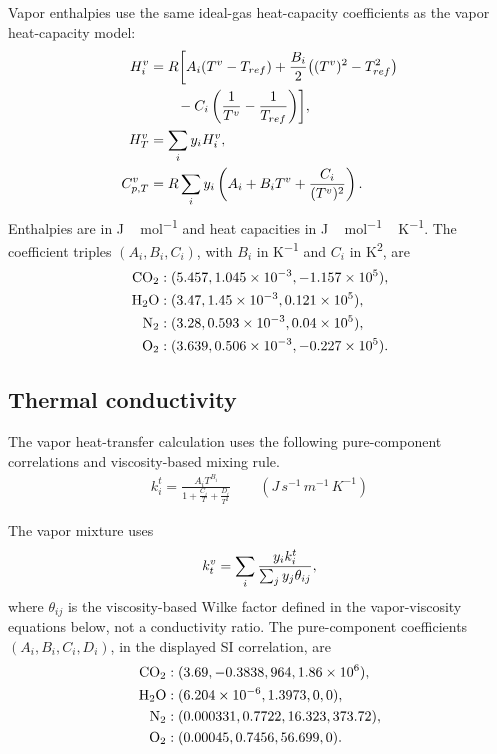Vapor enthalpies use the same ideal-gas heat-capacity coefficients as the vapor heat-capacity model:
\begin{align}
H_i^v &= R\biggl[A_i(T^v-T_{ref})+\frac{B_i}{2}\bigl((T^v)^2-T_{ref}^2\bigr)\notag\\
&\qquad-C_i\left(\frac{1}{T^v}-\frac{1}{T_{ref}}\right)\biggr],\\
H_T^v&=\sum_i y_iH_i^v,\\
C_{p,T}^v&=R\sum_i y_i\left(A_i+B_iT^v+\frac{C_i}{(T^v)^2}\right).
\end{align}
Enthalpies are in \unit{J\,mol^{-1}} and heat capacities in \unit{J\,mol^{-1}\,K^{-1}}.
The coefficient triples \((A_i,B_i,C_i)\), with \(B_i\) in \unit{K^{-1}} and \(C_i\) in \unit{K^2}, are
\begin{align*}
\COtwo &: (5.457,1.045\times10^{-3},-1.157\times10^5),\\
\HtwoO &: (3.47,1.45\times10^{-3},0.121\times10^5),\\
\Ntwo &: (3.28,0.593\times10^{-3},0.04\times10^5),\\
\Otwo &: (3.639,0.506\times10^{-3},-0.227\times10^5).
\end{align*}

\subsection{Thermal conductivity}
The vapor heat-transfer calculation uses the following pure-component correlations and viscosity-based mixing rule.
\begin{align}
k^{t}_{i} = \frac{A_i T^{B_i}}{1 + \frac{C_i}{T} + \frac{D_i}{T^2}}
\qquad \left(\unit{J\,s^{-1}\,m^{-1}\,K^{-1}}\right)
\end{align}

The vapor mixture uses
\begin{equation}
k_t^v=\sum_i\frac{y_i k_i^t}{\sum_j y_j\theta_{ij}},
\end{equation}
where \(\theta_{ij}\) is the viscosity-based Wilke factor defined in the vapor-viscosity equations below, not a conductivity ratio.
The pure-component coefficients \((A_i,B_i,C_i,D_i)\), in the displayed SI correlation, are
\begin{align*}
\COtwo &: (3.69,-0.3838,964,1.86\times10^6),\\
\HtwoO &: (6.204\times10^{-6},1.3973,0,0),\\
\Ntwo &: (0.000331,0.7722,16.323,373.72),\\
\Otwo &: (0.00045,0.7456,56.699,0).
\end{align*}


